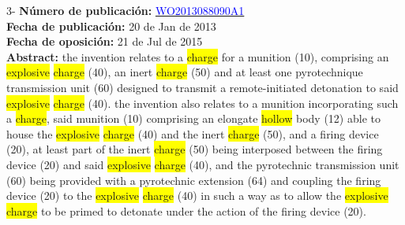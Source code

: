  \vspace{1cm}3- \textbf{Número de publicación:} \href{https://worldwide.espacenet.com/publicationDetails/biblio?DB=EPODOC&II=0&ND=3&adjacent=true&locale=en_EP&FT=D&date=20160331&CC=WO&NR=2013088090A1&KC=A1#}{\textcolor{blue}{WO2013088090A1}}\\ 
\textbf{Fecha de publicación:} 20 de Jan de 2013\\ 
\textbf{Fecha de oposición:} 21 de Jul de 2015\\ 
\textbf{Abstract:} the invention relates to a \colorbox{yellow}{\colorbox{yellow}{charge}} for a munition (10), comprising an \colorbox{yellow}{explosive} \colorbox{yellow}{\colorbox{yellow}{charge}} (40), an inert \colorbox{yellow}{\colorbox{yellow}{charge}} (50) and at least one pyrotechnique transmission unit (60) designed to transmit a remote-initiated detonation to said \colorbox{yellow}{explosive} \colorbox{yellow}{\colorbox{yellow}{charge}} (40). the invention also relates to a munition incorporating such a \colorbox{yellow}{\colorbox{yellow}{charge}}, said munition (10) comprising an elongate \colorbox{yellow}{\colorbox{yellow}{hollow}} body (12) able to house the \colorbox{yellow}{explosive} \colorbox{yellow}{\colorbox{yellow}{charge}} (40) and the inert \colorbox{yellow}{\colorbox{yellow}{charge}} (50), and a firing device (20), at least part of the inert \colorbox{yellow}{\colorbox{yellow}{charge}} (50) being interposed between the firing device (20) and said \colorbox{yellow}{explosive} \colorbox{yellow}{\colorbox{yellow}{charge}} (40), and the pyrotechnic transmission unit (60) being provided with a pyrotechnic extension (64) and coupling the firing device (20) to the \colorbox{yellow}{explosive} \colorbox{yellow}{\colorbox{yellow}{charge}} (40) in such a way as to allow the \colorbox{yellow}{explosive} \colorbox{yellow}{\colorbox{yellow}{charge}} to be primed to detonate under the action of the firing device (20).\\ 
 

